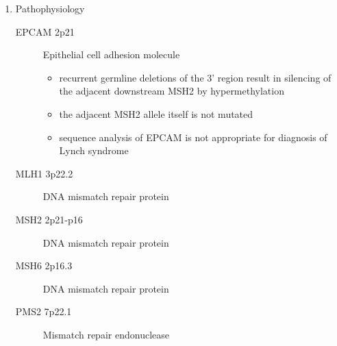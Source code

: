 \documentclass[12pt]{scrartcl}
\begin{document}
\begin{enumerate}
\item Pathophysiology
\label{sec:orge3e7cac}
\begin{description}
\item[{EPCAM 2p21}] Epithelial cell adhesion molecule
\begin{itemize}
\item recurrent germline deletions of the 3' region result in silencing
of the adjacent downstream MSH2 by hypermethylation
\item the adjacent MSH2 allele itself is not mutated
\item sequence analysis of EPCAM is not appropriate for diagnosis of
Lynch syndrome
\end{itemize}
\item[{MLH1 3p22​.2}] DNA mismatch repair protein
\item[{MSH2 2p21-p16}] DNA mismatch repair protein
\item[{MSH6 2p16​.3}] DNA mismatch repair protein
\item[{PMS2 7p22​.1}] Mismatch repair endonuclease
\end{description}
\end{enumerate}
\end{document}
